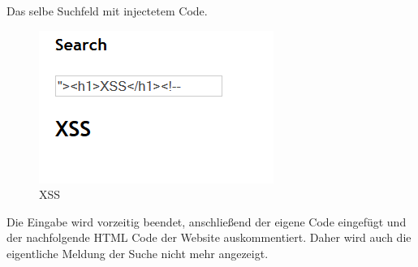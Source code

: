 Das selbe Suchfeld mit injectetem Code.
\begin{figure}[H]
	\begin{center}
		\includegraphics[width=0.3\linewidth]{images/xss2.png}
		\caption{XSS}
		\label{titel}
	\end{center}
\end{figure}
Die Eingabe wird vorzeitig beendet, anschlie{\ss}end der eigene Code eingef\"ugt und der nachfolgende HTML Code der Website auskommentiert. Daher wird auch die eigentliche Meldung der Suche nicht mehr angezeigt.
